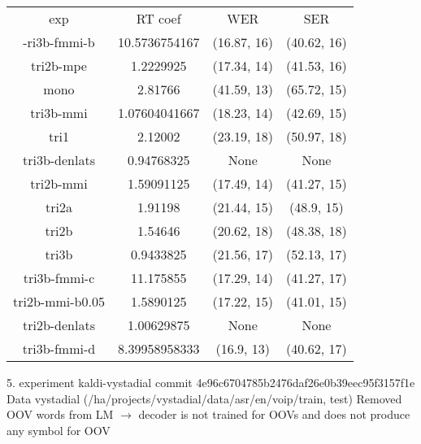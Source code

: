 \begin{tabular}{cccc}
exp             & RT coef       & WER         & SER        \\
-ri3b-fmmi-b    & 10.5736754167 & (16.87, 16) & (40.62, 16)\\
tri2b-mpe       & 1.2229925     & (17.34, 14) & (41.53, 16)\\
mono            & 2.81766       & (41.59, 13) & (65.72, 15)\\
tri3b-mmi       & 1.07604041667 & (18.23, 14) & (42.69, 15)\\
tri1            & 2.12002       & (23.19, 18) & (50.97, 18)\\
tri3b-denlats   & 0.94768325    & None        & None       \\
tri2b-mmi       & 1.59091125    & (17.49, 14) & (41.27, 15)\\
tri2a           & 1.91198       & (21.44, 15) & (48.9, 15) \\
tri2b           & 1.54646       & (20.62, 18) & (48.38, 18)\\
tri3b           & 0.9433825     & (21.56, 17) & (52.13, 17)\\
tri3b-fmmi-c    & 11.175855     & (17.29, 14) & (41.27, 17)\\
tri2b-mmi-b0.05 & 1.5890125     & (17.22, 15) & (41.01, 15)\\
tri2b-denlats   & 1.00629875    & None        & None       \\
tri3b-fmmi-d    & 8.39958958333 & (16.9, 13)  & (40.62, 17)
\end{tabular}


5. experiment kaldi-vystadial commit 4e96c6704785b2476daf26e0b39eec95f3157f1e
Data vystadial (/ha/projects/vystadial/data/asr/en/voip/{train, test})
Removed OOV words from LM $\longrightarrow$ decoder is not trained for OOVs and does not produce
any symbol for OOV

